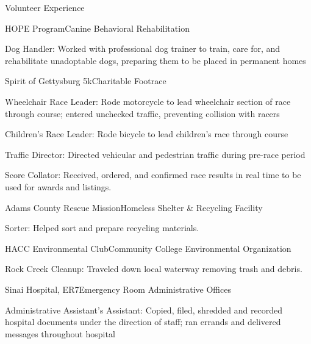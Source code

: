 \documentclass{resume} %
\begin{document}
\begin{rSection}{Volunteer Experience}


\begin{rSubsection}{HOPE Program}{}{Canine Behavioral Rehabilitation}{}
\item Dog Handler: Worked with professional dog trainer to train, care for, and rehabilitate unadoptable dogs, preparing them to be placed in permanent homes
\end{rSubsection}


\begin{rSubsection}{Spirit of Gettysburg 5k}{}{Charitable Footrace}{}
\item Wheelchair Race Leader: Rode motorcycle to lead wheelchair section of race through course; entered unchecked traffic, preventing collision with racers
\item Children's Race Leader: Rode bicycle to lead children's race through course
\item Traffic Director: Directed vehicular and pedestrian traffic during pre-race period
\item Score Collator: Received, ordered, and confirmed race results in real time to be used for awards and listings.
\end{rSubsection}


\begin{rSubsection}{Adams County Rescue Mission}{}{Homeless Shelter \& Recycling Facility}{}
\item Sorter: Helped sort and prepare recycling materials.
\end{rSubsection}


\begin{rSubsection}{HACC Environmental Club}{}{Community College Environmental Organization}{}
\item Rock Creek Cleanup: Traveled down local waterway removing trash and debris.
\end{rSubsection}


\begin{rSubsection}{Sinai Hospital, ER7}{}{Emergency Room Administrative Offices}{}
\item Administrative Assistant's Assistant: Copied, filed, shredded and recorded hospital documents under the direction of staff; ran errands and delivered messages throughout hospital
\end{rSubsection}

\end{rSection}
\end{document}
